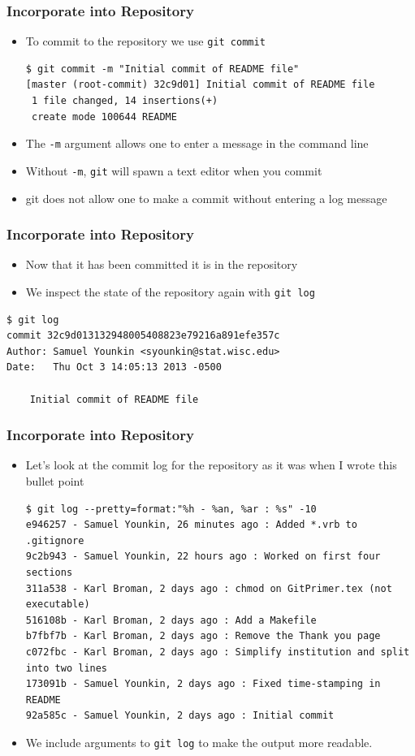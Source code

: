 \documentclass[12pt,t]{beamer}
\newcommand{\bbi}{\vspace{24pt} \begin{itemize} \itemsep8pt}
\newcommand{\ei}{\end{itemize}}
\begin{document}
\begin{frame}[fragile]
\frametitle{Incorporate into Repository}
\bbi
\item To commit to the repository we use \texttt{git commit}
\begin{semiverbatim}
\begin{lstlisting}
$ git commit -m "Initial commit of README file"
[master (root-commit) 32c9d01] Initial commit of README file
 1 file changed, 14 insertions(+)
 create mode 100644 README
\end{lstlisting}
\end{semiverbatim}
\item The \texttt{-m} argument allows one to enter a message in the command line
\item Without \texttt{-m}, \texttt{git} will spawn a text editor when you commit
\item git does not allow one to make a commit without entering a log message
\ei
\end{frame}

\begin{frame}[fragile]
\frametitle{Incorporate into Repository}
\bbi
\item Now that it has been committed it is in the repository 
\item We inspect the state of the repository again with \texttt{git log}
\ei
\begin{semiverbatim}
\begin{lstlisting}
$ git log
commit 32c9d013132948005408823e79216a891efe357c
Author: Samuel Younkin <syounkin@stat.wisc.edu>
Date:   Thu Oct 3 14:05:13 2013 -0500

    Initial commit of README file

\end{lstlisting}
\end{semiverbatim}
\end{frame}

\begin{frame}[fragile]
\frametitle{Incorporate into Repository}
\bbi
\item Let's look at the commit log for the repository as it was when I wrote this bullet point
{\footnotesize \begin{semiverbatim}
\begin{lstlisting}
$ git log --pretty=format:"%h - %an, %ar : %s" -10
e946257 - Samuel Younkin, 26 minutes ago : Added *.vrb to .gitignore
9c2b943 - Samuel Younkin, 22 hours ago : Worked on first four sections
311a538 - Karl Broman, 2 days ago : chmod on GitPrimer.tex (not executable)
516108b - Karl Broman, 2 days ago : Add a Makefile
b7fbf7b - Karl Broman, 2 days ago : Remove the Thank you page
c072fbc - Karl Broman, 2 days ago : Simplify institution and split into two lines
173091b - Samuel Younkin, 2 days ago : Fixed time-stamping in README
92a585c - Samuel Younkin, 2 days ago : Initial commit
\end{lstlisting}
\end{semiverbatim}}
\item We include arguments to \texttt{git log} to make the output more readable.
\ei
\end{frame}
\end{document}
